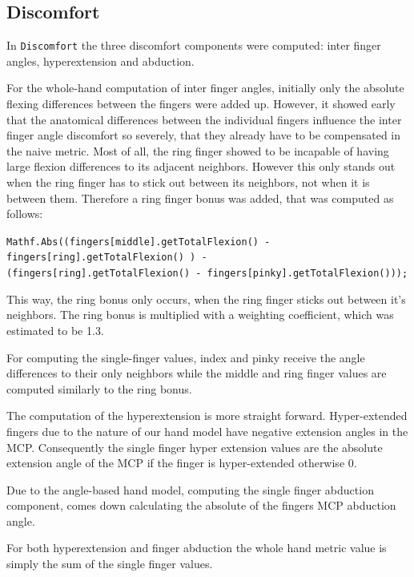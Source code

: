 \subsection{Discomfort}

In \texttt{Discomfort} the three discomfort components were computed: inter finger angles, hyperextension and abduction.

For the whole-hand computation of inter finger angles, initially only the absolute flexing differences between the fingers were added up. However, it showed early that the anatomical differences between the individual fingers influence the inter finger angle discomfort so severely, that they already have to be compensated in the naive metric. Most of all, the ring finger showed to be incapable of having large flexion differences to its adjacent neighbors. However this only stands out when the ring finger has to stick out between its neighbors, not when it is between them. Therefore a ring finger bonus was added, that was computed as follows: 
\vspace{5pt}
\begin{center}
\texttt{Mathf.Abs((fingers[middle].getTotalFlexion() - fingers[ring].getTotalFlexion() ) - \\
(fingers[ring].getTotalFlexion() - fingers[pinky].getTotalFlexion()));}
\end{center}
\vspace{5pt}
This way, the ring bonus only occurs, when the ring finger sticks out between it's neighbors. The ring bonus is multiplied with a weighting coefficient, which was estimated to be 1.3.

For computing the single-finger values, index and pinky receive the angle differences to their only neighbors while the middle and ring finger values are computed similarly to the ring bonus. 

The computation of the hyperextension is more straight forward. Hyper-extended fingers due to the nature of our hand model have negative extension angles in the MCP. Consequently the single finger hyper extension values are the absolute extension angle of the MCP if the finger is hyper-extended otherwise 0. 

Due to the angle-based hand model, computing the single finger abduction component, comes down calculating the absolute of the fingers MCP abduction angle.

For both hyperextension and finger abduction the whole hand metric value is simply the sum of the single finger values. 

